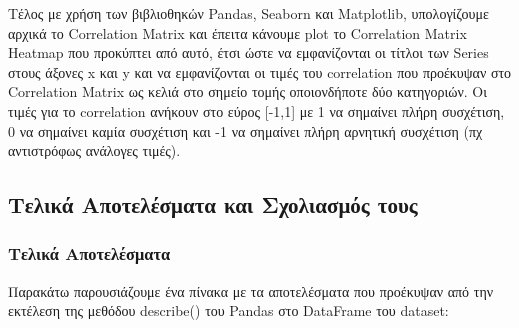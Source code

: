 \documentclass[12pt,a4paper]{article}
\begin{document}
Τέλος με χρήση των βιβλιοθηκών Pandas, Seaborn και Matplotlib, υπολογίζουμε αρχικά το Correlation Matrix και έπειτα κάνουμε plot το Correlation Matrix Heatmap που προκύπτει από αυτό, έτσι ώστε να εμφανίζονται οι τίτλοι των Series στους άξονες x και y και να εμφανίζονται οι τιμές του correlation που προέκυψαν στο Correlation Matrix ως κελιά στο σημείο τομής οποιονδήποτε δύο κατηγοριών. Οι τιμές για το correlation ανήκουν στο εύρος [-1,1] με 1 να σημαίνει πλήρη συσχέτιση, 0 να σημαίνει καμία συσχέτιση και -1 να σημαίνει πλήρη αρνητική συσχέτιση (πχ αντιστρόφως ανάλογες τιμές).

\subsection{Τελικά Αποτελέσματα και Σχολιασμός τους}

\subsubsection{Τελικά Αποτελέσματα}
Παρακάτω παρουσιάζουμε ένα πίνακα με τα αποτελέσματα που προέκυψαν από την εκτέλεση της μεθόδου describe() του Pandas στο DataFrame του dataset:
\end{document}
